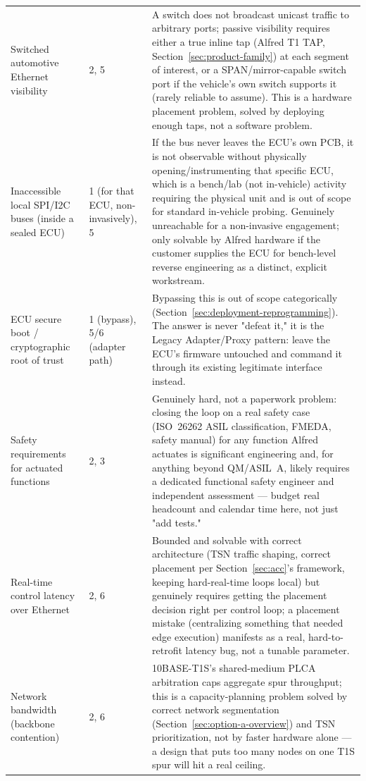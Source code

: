 \begin{center}
\begin{longtable}{@{}p{2.4cm} p{1.7cm} p{11.2cm}@{}}
Switched automotive Ethernet visibility & 2, 5 & A switch does not broadcast unicast traffic to arbitrary ports; passive visibility requires either a true inline tap (Alfred T1 TAP, Section~\ref{sec:product-family}) at each segment of interest, or a SPAN/mirror-capable switch port if the vehicle's own switch supports it (rarely reliable to assume). This is a hardware placement problem, solved by deploying enough taps, not a software problem. \\
Inaccessible local SPI/I2C buses (inside a sealed ECU) & 1 (for that ECU, non-invasively), 5 & If the bus never leaves the ECU's own PCB, it is not observable without physically opening/instrumenting that specific ECU, which is a bench/lab (not in-vehicle) activity requiring the physical unit and is out of scope for standard in-vehicle probing. Genuinely unreachable for a non-invasive engagement; only solvable by Alfred hardware if the customer supplies the ECU for bench-level reverse engineering as a distinct, explicit workstream. \\
ECU secure boot / cryptographic root of trust & 1 (bypass), 5/6 (adapter path) & Bypassing this is out of scope categorically (Section~\ref{sec:deployment-reprogramming}). The answer is never "defeat it," it is the Legacy Adapter/Proxy pattern: leave the ECU's firmware untouched and command it through its existing legitimate interface instead. \\
Safety requirements for actuated functions & 2, 3 & Genuinely hard, not a paperwork problem: closing the loop on a real safety case (ISO~26262 ASIL classification, FMEDA, safety manual) for any function Alfred actuates is significant engineering and, for anything beyond QM/ASIL~A, likely requires a dedicated functional safety engineer and independent assessment --- budget real headcount and calendar time here, not just "add tests." \\
Real-time control latency over Ethernet & 2, 6 & Bounded and solvable with correct architecture (TSN traffic shaping, correct placement per Section~\ref{sec:acc}'s framework, keeping hard-real-time loops local) but genuinely requires getting the placement decision right per control loop; a placement mistake (centralizing something that needed edge execution) manifests as a real, hard-to-retrofit latency bug, not a tunable parameter. \\
Network bandwidth (backbone contention) & 2, 6 & 10BASE-T1S's shared-medium PLCA arbitration caps aggregate spur throughput; this is a capacity-planning problem solved by correct network segmentation (Section~\ref{sec:option-a-overview}) and TSN prioritization, not by faster hardware alone --- a design that puts too many nodes on one T1S spur will hit a real ceiling. \\

\end{longtable}
\end{center}
